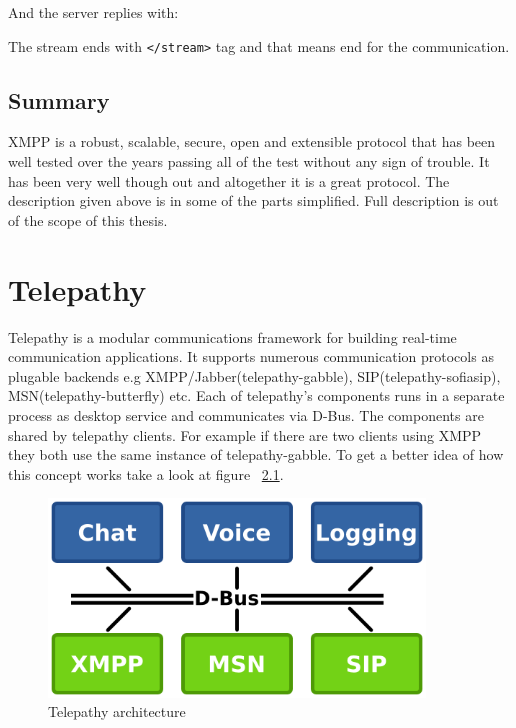 And the server replies with:



The stream ends with \verb|</stream>| tag and that means end for the communication. 


\section{Summary}
XMPP is a robust, scalable, secure, open and extensible protocol that has been well tested over the years passing all of the test without any sign of trouble. It has been very well though out and altogether it is a great protocol. The description given above is in some of the parts simplified. Full description is out of the scope of this thesis.   



\chapter{Telepathy}
Telepathy\cite{telepathy} is a modular communications framework for building real-time communication applications. It supports numerous communication protocols as plugable backends e.g XMPP/Jabber(telepathy-gabble), SIP(telepathy-sofiasip), MSN(telepathy-butterfly) etc. Each of telepathy's components runs in a separate process as desktop service and communicates via D-Bus. The components are shared by telepathy clients. For example if there are two clients using XMPP they both use the same instance of telepathy-gabble. To get a better idea of how this concept works take a look at figure ~\ref{fig:telepathyArchitecture}.\cite{TPWiki} 

\begin{figure}[ht]
\begin{center}
	\includegraphics[width=10cm]{fig/telepathy-architecture-overview.png}
	\caption{Telepathy architecture\cite{TPWiki}}
	\label{fig:telepathyArchitecture}
\end{center}
\end{figure}


